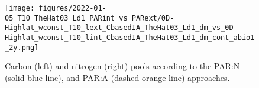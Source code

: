 \documentclass[gmd, manuscript, draft]{copernicus}
\begin{document}
\begin{figure}[ht!]
\texttt{[image: figures/2022-01-05\_T10\_TheHat03\_Ld1\_PARint\_vs\_PARext/0D-Highlat\_wconst\_T10\_lext\_CbasedIA\_TheHat03\_Ld1\_dm\_vs\_0D-Highlat\_wconst\_T10\_lint\_CbasedIA\_TheHat03\_Ld1\_dm\_cont\_abio1\_2y.png]}
\caption{Carbon (left) and nitrogen (right) pools according to the PAR:N (solid blue line), and PAR:A (dashed orange line) approaches. \label{f.CNvars}}
\end{figure}















\end{document}
